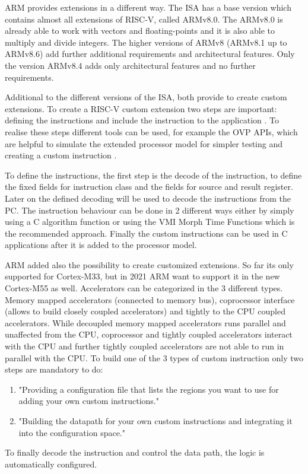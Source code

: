 \documentclass[conference]{IEEEtran}
\begin{document}
ARM provides extensions in a different way. The \gls{ISA} has a base version which contains almost all extensions of RISC-V, called ARMv8.0. The ARMv8.0 is already able to work with vectors and floating-points and it is also able to multiply and divide integers. The higher versions of ARMv8 (ARMv8.1 up to ARMv8.6) add further additional requirements and architectural features. Only the version ARMv8.4 adds only architectural features and no further requirements. \cite{Arm2020}

Additional to the different versions of the \gls{ISA}, both provide to create custom extensions.
To create a RISC-V custom extension two steps are important: defining the instructions and include the instruction to the application \cite{Limited2019}. To realise these steps different tools can be used, for example the OVP APIs, which are helpful to simulate the extended processor model for simpler testing and creating a custom instruction \cite{Imperas}.

To define the instructions, the first step is the decode of the instruction, to define the fixed fields for instruction class and the fields for source and result register. Later on the defined decoding will be used to decode the instructions from the PC. The instruction behaviour can be done in 2 different ways either by simply using a C algorithm function or using the VMI Morph Time Functions which is the recommended approach. Finally the custom instructions can be used in C applications after it is added to the processor model. \cite{Limited2019}

ARM added also the possibility to create customized extensions. So far its only supported for Cortex-M33, but in 2021 ARM want to support it in the new Cortex-M55 as well. Accelerators can be categorized in the 3 different types. Memory mapped accelerators (connected to memory bus), coprocessor interface (allows to build closely coupled accelerators) and tightly to the CPU coupled accelerators. 
While decoupled memory mapped accelerators runs parallel and unaffected from the CPU, coprocessor and tightly coupled accelerators interact with the CPU and further tightly coupled accelerators are not able to run in parallel with the CPU. To build one of the 3 types of custom instruction only two steps are mandatory to do: 
\begin{enumerate}
\item "Providing a configuration file that lists the regions you want to use for adding your own custom instructions." \cite[page 4]{LauranneChoquin2020}
\item "Building the datapath for your own custom instructions and integrating
it into the configuration space." \cite[page 4]{LauranneChoquin2020}
\end{enumerate}
To finally decode the instruction and control the data path, the logic is automatically configured. \cite{LauranneChoquin2020}
\end{document}
